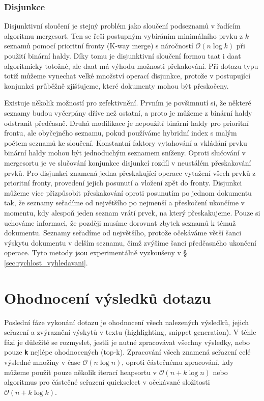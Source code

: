 \documentclass[11pt,letterpaper,oneside,openright]{book}
\newcommand{\bftt}[1]{\texttt{\textbf{#1}}}
\begin{document}
\subsubsection{Disjunkce} \label{sec:disjunctive_merge}
Disjunktivní sloučení je stejný problém jako sloučení podseznamů v řadícím
algoritmu mergesort. Ten se řeší postupným vybíráním minimálního prvku z $k$
seznamů pomocí prioritní fronty (K-way merge) s náročností $\mathcal{O}(n \log
k)$ při použití binární haldy. Díky tomu je disjunktivní sloučení formou taat i
daat algoritmicky totožné, ale daat má výhodu možnosti překakování. Při dotazu
typu  totiž můžeme vynechat velké množství operací
disjunkce, protože v postupující konjunkci průběžně zjišťujeme, které dokumenty
mohou být přeskočeny.

Existuje několik možností pro zefektivnění. Prvním je povšimnutí si, že některé
seznamy budou vyčerpány dříve než ostatní, a proto je můžeme z binární haldy
odstranit předčasně. Druhá modifikace je nepoužití binární haldy pro prioritní
frontu, ale obyčejného seznamu, pokud používáme hybridní index s malým počtem
seznamů ke sloučení. Konstantní faktory vytahování a vkládání prvku binární
haldy mohou být jednoduchým seznamem sníženy. Oproti slučování v mergesortu je
ve slučování konjunkce disjunkcí rozdíl v neustálém přeskakování prvků. Pro
disjunkci znamená jedna přeskakující operace vytažení všech prvků z prioritní
fronty, provedení jejich posunutí a vložení zpět do fronty. Disjunkci můžeme
více přizpůsobit přeskakování oproti posunutím po jednom dokumentu tak, že
seznamy seřadíme od největšího po nejmenší a přeskočení ukončíme v momentu, kdy
alespoň jeden seznam vrátí prvek, na který přeskakujeme. Pouze si uchováme
informaci, že později musíme dorovnat zbytek seznamů k témuž dokumentu. Seznamy
seřadíme od největšího, protože očekáváme větší šanci výskytu dokumentu v
delším seznamu, čímž zvýšíme šanci předčasného ukončení operace. Tyto metody
jsou experimentálně vyzkoušeny v \S\,\ref{sec:rychlost_vyhledavani}.




\section{Ohodnocení výsledků dotazu} \label{sec:ohodnoceni_vysledku}
Poslední fáze vykonání dotazu je ohodnocení všech nalezených výsledků, jejich
seřazení a zvýraznění výskytů v textu (highlighting, snippet generation). V
téhle fázi je důležité se rozmyslet, jestli je nutné zpracovávat všechny
výsledky, nebo pouze \bftt{k} nejlépe ohodnocených (top-k). Zpracování všech
znamená seřazení celé výsledné množiny v čase $\mathcal{O}(n \log n)$, oproti
částečnému zpracování, kdy můžeme použít pouze několik iterací heapsortu v
$\mathcal{O}(n + k \log n)$ nebo algoritmus pro částečné seřazení quickselect v
očekávané složitosti $\mathcal{O}(n + k \log k)$.
\end{document}
